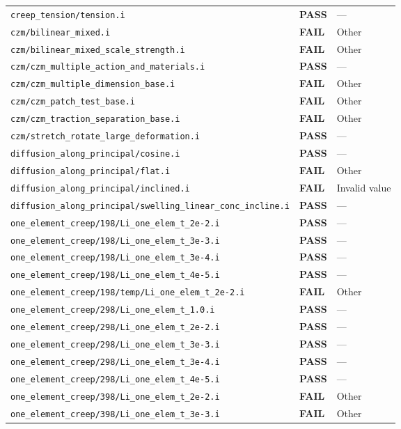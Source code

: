 \documentclass[10pt,letterpaper]{article}
\newcommand{\PASS}{\textcolor{passgreen}{\textbf{PASS}}}
\newcommand{\FAIL}{\textcolor{failred}{\textbf{FAIL}}}
\newcommand{\code}[1]{\texttt{\small #1}}
\begin{document}
\begin{longtable}{p{} l p{}}
\code{creep\_tension/tension.i} & \PASS & --- \\
\code{czm/bilinear\_mixed.i} & \FAIL & Other \\
\code{czm/bilinear\_mixed\_scale\_strength.i} & \FAIL & Other \\
\code{czm/czm\_multiple\_action\_and\_materials.i} & \PASS & --- \\
\code{czm/czm\_multiple\_dimension\_base.i} & \FAIL & Other \\
\code{czm/czm\_patch\_test\_base.i} & \FAIL & Other \\
\code{czm/czm\_traction\_separation\_base.i} & \FAIL & Other \\
\code{czm/stretch\_rotate\_large\_deformation.i} & \PASS & --- \\
\code{diffusion\_along\_principal/cosine.i} & \PASS & --- \\
\code{diffusion\_along\_principal/flat.i} & \FAIL & Other \\
\code{diffusion\_along\_principal/inclined.i} & \FAIL & Invalid value \\
\code{diffusion\_along\_principal/swelling\_linear\_conc\_incline.i} & \PASS & --- \\
\code{one\_element\_creep/198/Li\_one\_elem\_t\_2e-2.i} & \PASS & --- \\
\code{one\_element\_creep/198/Li\_one\_elem\_t\_3e-3.i} & \PASS & --- \\
\code{one\_element\_creep/198/Li\_one\_elem\_t\_3e-4.i} & \PASS & --- \\
\code{one\_element\_creep/198/Li\_one\_elem\_t\_4e-5.i} & \PASS & --- \\
\code{one\_element\_creep/198/temp/Li\_one\_elem\_t\_2e-2.i} & \FAIL & Other \\
\code{one\_element\_creep/298/Li\_one\_elem\_t\_1.0.i} & \PASS & --- \\
\code{one\_element\_creep/298/Li\_one\_elem\_t\_2e-2.i} & \PASS & --- \\
\code{one\_element\_creep/298/Li\_one\_elem\_t\_3e-3.i} & \PASS & --- \\
\code{one\_element\_creep/298/Li\_one\_elem\_t\_3e-4.i} & \PASS & --- \\
\code{one\_element\_creep/298/Li\_one\_elem\_t\_4e-5.i} & \PASS & --- \\
\code{one\_element\_creep/398/Li\_one\_elem\_t\_2e-2.i} & \FAIL & Other \\
\code{one\_element\_creep/398/Li\_one\_elem\_t\_3e-3.i} & \FAIL & Other \\

\end{longtable}
\end{document}
